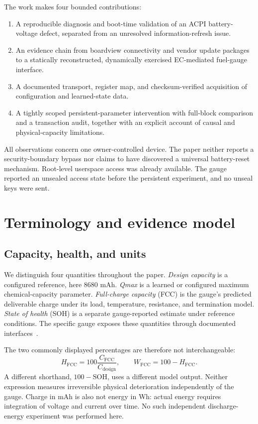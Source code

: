 \documentclass[11pt,a4paper]{article}
\newcommand{\fcc}{C_{\mathrm{FCC}}}
\newcommand{\design}{C_{\mathrm{design}}}
\begin{document}
The work makes four bounded contributions:
\begin{enumerate}
\item A reproducible diagnosis and boot-time validation of an ACPI battery-voltage defect, separated from an unresolved information-refresh issue.
\item An evidence chain from boardview connectivity and vendor update packages to a statically reconstructed, dynamically exercised EC-mediated fuel-gauge interface.
\item A documented transport, register map, and checksum-verified acquisition of configuration and learned-state data.
\item A tightly scoped persistent-parameter intervention with full-block comparison and a transaction audit, together with an explicit account of causal and physical-capacity limitations.
\end{enumerate}

All observations concern one owner-controlled device. The paper neither reports a security-boundary bypass nor claims to have discovered a universal battery-reset mechanism. Root-level userspace access was already available. The gauge reported an unsealed access state before the persistent experiment, and no unseal keys were sent.

\section{Terminology and evidence model}
\subsection{Capacity, health, and units}
We distinguish four quantities throughout the paper. \emph{Design capacity} is a configured reference, here 8680 mAh. \emph{Qmax} is a learned or configured maximum chemical-capacity parameter. \emph{Full-charge capacity} (FCC) is the gauge's predicted deliverable charge under its load, temperature, resistance, and termination model. \emph{State of health} (SOH) is a separate gauge-reported estimate under reference conditions. The specific gauge exposes these quantities through documented interfaces~\cite{ti-trm}.

The two commonly displayed percentages are therefore not interchangeable:
\begin{equation}
 H_{\mathrm{FCC}}=100\frac{\fcc}{\design},\qquad W_{\mathrm{FCC}}=100-H_{\mathrm{FCC}}.
\end{equation}
A different shorthand, $100-\mathrm{SOH}$, uses a different model output. Neither expression measures irreversible physical deterioration independently of the gauge. Charge in mAh is also not energy in Wh: actual energy requires integration of voltage and current over time. No such independent discharge-energy experiment was performed here.
\end{document}
